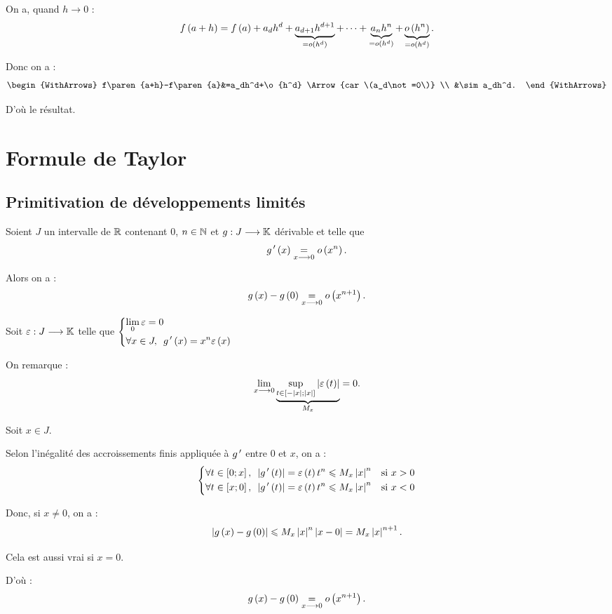 \begin{dem}
On a, quand \(h\to0\) : \[f\left(a+h\right)=f\left(a\right)+a_dh^d+\underbrace{a_{d+1}h^{d+1}}_{=o\left(h^d\right)}+\dots+\underbrace{a_nh^n}_{=o\left(h^d\right)}+\underbrace{o\left(h^n\right)}_{=o\left(h^d\right)}.\]

Donc on a : \[\begin{WithArrows}
f\paren{a+h}-f\paren{a}&=a_dh^d+\o{h^d} \Arrow{car \(a_d\not=0\)} \\
&\sim a_dh^d.
\end{WithArrows}\]

D'où le résultat.
\end{dem}

\section{Formule de Taylor}

\subsection{Primitivation de développements limités}

\begin{lem}
Soient \(J\) un intervalle de \(\mathbb{R}\) contenant \(0\), \(n\in\mathbb{N}\) et \(g:J\longrightarrow\mathbb{K}\) dérivable et telle que \[g^{\,\prime}\left(x\right)\underset{x\longrightarrow0}{=}o\left(x^n\right).\]

Alors on a : \[g\left(x\right)-g\left(0\right)\underset{x\longrightarrow0}{=}o\left(x^{n+1}\right).\]
\end{lem}

\begin{dem}
Soit \(\varepsilon:J\longrightarrow\mathbb{K}\) telle que \(\begin{dcases}
\lim_0\epsilon=0 \\
\quantifs{\forall x\in J}g\prim\paren{x}=x^n\epsilon\paren{x}
\end{dcases}\)

On remarque : \[\lim_{x\longrightarrow0}\underbrace{\sup_{t\in\left[-\left\lvert x\right\rvert;\left\lvert x\right\rvert\right]}\left\lvert\varepsilon\left(t\right)\right\rvert}_{M_x}=0.\]

Soit \(x\in J\).

Selon l'inégalité des accroissements finis appliquée à \(g^{\,\prime}\) entre \(0\) et \(x\), on a : \[\begin{dcases}
\quantifs{\forall t\in\intervii{0}{x}}\abs{g\prim\paren{t}}=\epsilon\paren{t}t^n\leq M_x\abs{x}^n &\text{si }x>0 \\
\quantifs{\forall t\in\intervii{x}{0}}\abs{g\prim\paren{t}}=\epsilon\paren{t}t^n\leq M_x\abs{x}^n &\text{si }x<0
\end{dcases}\]

Donc, si \(x\not=0\), on a : \[\left\lvert g\left(x\right)-g\left(0\right)\right\rvert\leqslant M_x\left\lvert x\right\rvert^n\left\lvert x-0\right\rvert=M_x\left\lvert x\right\rvert^{n+1}.\]

Cela est aussi vrai si \(x=0\).

D'où : \[g\left(x\right)-g\left(0\right)\underset{x\longrightarrow0}{=}o\left(x^{n+1}\right).\]
\end{dem}

